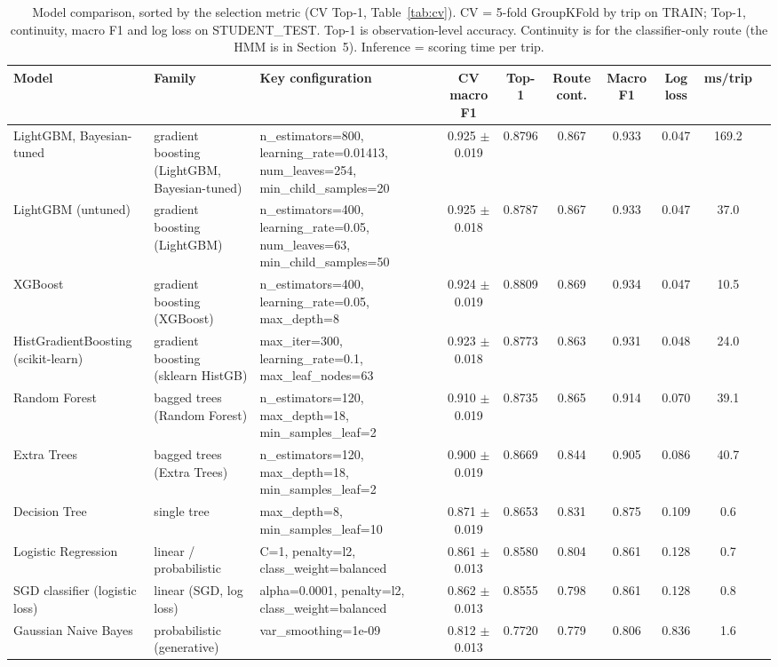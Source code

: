 \documentclass[11pt,a4paper]{article}
\begin{document}
\begin{table}[H]\centering\scriptsize
\caption{Model comparison, sorted by the selection metric (CV Top-1, Table~\ref{tab:cv}). CV = 5-fold GroupKFold by trip on TRAIN; Top-1, continuity, macro F1 and log loss on STUDENT\_TEST. Top-1 is observation-level accuracy. Continuity is for the classifier-only route (the HMM is in Section~5). Inference = scoring time per trip.}\label{tab:comp}
\begin{tabular}{p{2.3cm}p{2.2cm}p{3.6cm}ccccccc}\toprule
Model & Family & Key configuration & CV macro F1 & Top-1 & Route cont. & Macro F1 & Log loss & ms/trip \\ \midrule
LightGBM, Bayesian-tuned & gradient boosting (LightGBM, Bayesian-tuned) & n\_estimators=800, learning\_rate=0.01413, num\_leaves=254, min\_child\_samples=20 & 0.925 $\pm$ 0.019 & 0.8796 & 0.867 & 0.933 & 0.047 & 169.2 \\
LightGBM (untuned) & gradient boosting (LightGBM) & n\_estimators=400, learning\_rate=0.05, num\_leaves=63, min\_child\_samples=50 & 0.925 $\pm$ 0.018 & 0.8787 & 0.867 & 0.933 & 0.047 & 37.0 \\
XGBoost & gradient boosting (XGBoost) & n\_estimators=400, learning\_rate=0.05, max\_depth=8 & 0.924 $\pm$ 0.019 & 0.8809 & 0.869 & 0.934 & 0.047 & 10.5 \\
HistGradientBoosting (scikit-learn) & gradient boosting (sklearn HistGB) & max\_iter=300, learning\_rate=0.1, max\_leaf\_nodes=63 & 0.923 $\pm$ 0.018 & 0.8773 & 0.863 & 0.931 & 0.048 & 24.0 \\
Random Forest & bagged trees (Random Forest) & n\_estimators=120, max\_depth=18, min\_samples\_leaf=2 & 0.910 $\pm$ 0.019 & 0.8735 & 0.865 & 0.914 & 0.070 & 39.1 \\
Extra Trees & bagged trees (Extra Trees) & n\_estimators=120, max\_depth=18, min\_samples\_leaf=2 & 0.900 $\pm$ 0.019 & 0.8669 & 0.844 & 0.905 & 0.086 & 40.7 \\
Decision Tree & single tree & max\_depth=8, min\_samples\_leaf=10 & 0.871 $\pm$ 0.019 & 0.8653 & 0.831 & 0.875 & 0.109 & 0.6 \\
Logistic Regression & linear / probabilistic & C=1, penalty=l2, class\_weight=balanced & 0.861 $\pm$ 0.013 & 0.8580 & 0.804 & 0.861 & 0.128 & 0.7 \\
SGD classifier (logistic loss) & linear (SGD, log loss) & alpha=0.0001, penalty=l2, class\_weight=balanced & 0.862 $\pm$ 0.013 & 0.8555 & 0.798 & 0.861 & 0.128 & 0.8 \\
Gaussian Naive Bayes & probabilistic (generative) & var\_smoothing=1e-09 & 0.812 $\pm$ 0.013 & 0.7720 & 0.779 & 0.806 & 0.836 & 1.6 \\
\bottomrule\end{tabular}\end{table}
\end{document}
